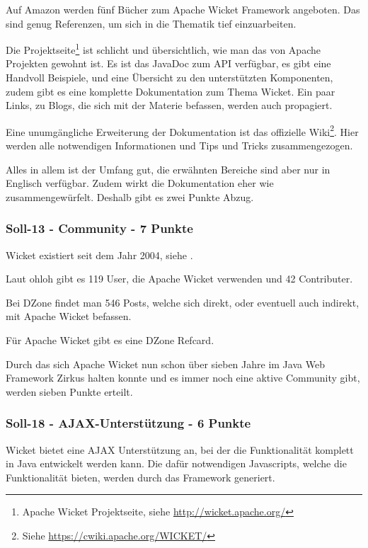  Auf Amazon werden fünf Bücher zum Apache Wicket Framework
  angeboten. Das sind genug Referenzen, um sich in die Thematik tief
  einzuarbeiten.
  
  Die Projektseite\footnote{Apache Wicket Projektseite, siehe
  \url{http://wicket.apache.org/}} ist schlicht und übersichtlich, wie man das
  von Apache Projekten gewohnt ist. Es ist das JavaDoc zum \ac{API} verfügbar,
  es gibt eine Handvoll Beispiele, und eine Übersicht zu den unterstützten
  Komponenten, zudem gibt es eine komplette Dokumentation zum Thema Wicket. Ein
  paar Links, zu Blogs, die sich mit der Materie befassen, werden auch
  propagiert.
  
  Eine unumgängliche Erweiterung der Dokumentation ist das offizielle
  Wiki\footnote{Siehe \url{https://cwiki.apache.org/WICKET/}}. Hier werden alle
  notwendigen Informationen und Tips und Tricks zusammengezogen.
  
  Alles in allem ist der Umfang gut, die erwähnten Bereiche sind aber nur in
  Englisch verfügbar. Zudem wirkt die Dokumentation eher wie zusammengewürfelt.
  Deshalb gibt es zwei Punkte Abzug.
 
  \subsubsection{Soll-13 - Community - 7 Punkte}
  
  Wicket existiert seit dem Jahr 2004, siehe \cite{WikiWicket}.

  Laut ohloh gibt es 119 User, die Apache Wicket verwenden und 42 Contributer.

  Bei DZone findet man 546 Posts, welche sich direkt, oder eventuell auch
  indirekt, mit Apache Wicket befassen.

  Für Apache Wicket gibt es eine DZone Refcard.
  
  Durch das sich Apache Wicket nun schon über sieben Jahre im Java Web Framework
  Zirkus halten konnte und es immer noch eine aktive Community gibt, werden
  sieben Punkte erteilt.
  
  \subsubsection{Soll-18 - AJAX-Unterstützung - 6 Punkte}
  
  Wicket bietet eine AJAX Unterstützung an, bei der die Funktionalität komplett
  in Java entwickelt werden kann. Die dafür notwendigen Javascripts, welche die
  Funktionalität bieten, werden durch das Framework generiert.
  
